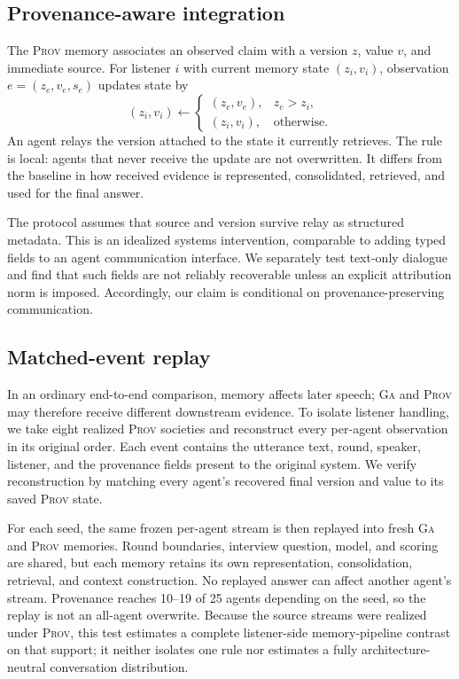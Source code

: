 \documentclass[sigconf,anonymous]{acmart}
\newcommand{\prov}{\textsc{Prov}}
\newcommand{\ga}{\textsc{Ga}}
\begin{document}
\subsection{Provenance-aware integration}

The \prov{} memory associates an observed claim with a version $z$, value $v$, and immediate
source.  For listener $i$ with current memory state $(z_i,v_i)$, observation $e=(z_e,v_e,s_e)$
updates state by
\[
  (z_i,v_i) \leftarrow
  \begin{cases}
    (z_e,v_e), & z_e > z_i,\\
    (z_i,v_i), & \text{otherwise}.
  \end{cases}
\]
An agent relays the version attached to the state it currently retrieves.  The rule is local:
agents that never receive the update are not overwritten.  It differs from the baseline in how
received evidence is represented, consolidated, retrieved, and used for the final answer.

The protocol assumes that source and version survive relay as structured metadata.  This is an
idealized systems intervention, comparable to adding typed fields to an agent communication
interface.  We separately test text-only dialogue and find that such fields are not reliably
recoverable unless an explicit attribution norm is imposed.  Accordingly, our claim is
conditional on provenance-preserving communication.

\subsection{Matched-event replay}

In an ordinary end-to-end comparison, memory affects later speech; \ga{} and \prov{} may therefore
receive different downstream evidence.  To isolate listener handling, we take eight realized
\prov{} societies and reconstruct every per-agent observation in its original order.  Each event
contains the utterance text, round, speaker, listener, and the provenance fields present to the
original system.  We verify reconstruction by matching every agent's recovered final version and
value to its saved \prov{} state.

For each seed, the same frozen per-agent stream is then replayed into fresh \ga{} and \prov{}
memories.  Round boundaries, interview question, model, and scoring are shared, but each memory
retains its own representation, consolidation, retrieval, and context construction.  No replayed
answer can affect another agent's stream.  Provenance reaches 10--19 of 25 agents depending on the
seed, so the replay is not an all-agent overwrite.  Because the source streams were realized under
\prov{}, this test estimates a complete listener-side memory-pipeline contrast on that support;
it neither isolates one rule nor estimates a fully architecture-neutral conversation
distribution.
\end{document}
